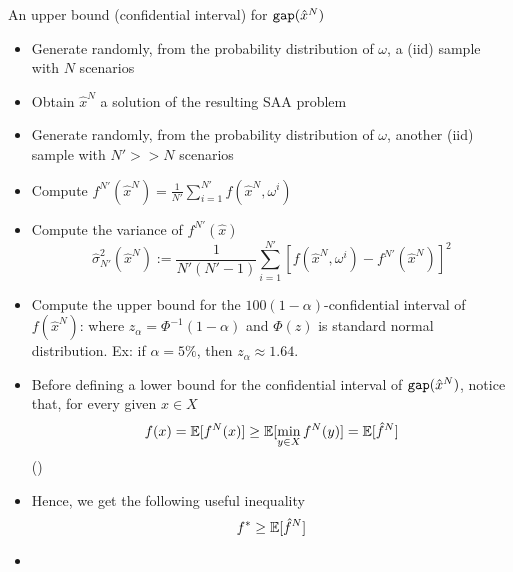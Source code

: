  
\begin{frame}{An upper bound (confidential interval) for ${\tt gap}(\hat x^N)$}
\begin{itemize}
\item Generate randomly, from the probability distribution of $\omega$, a (iid) sample with $N$ scenarios 
\pula
\item Obtain  $\hat x^N$ a solution of the resulting SAA problem
\pula
\item Generate randomly, from the probability distribution of $\omega$, another (iid) sample with $N'>>N$ scenarios 
\pula
\item Compute $f^{N'}(\hat x^N)= \frac{1}{N'}\sum_{i=1}^{N'} f(\hat x^N,\omega^i)$
\pula
\item Compute the variance of $f^{N'}(\hat x)$
\[
\hat \sigma_{N'}^2(\hat x^N):=\frac{1}{N'(N'-1)}\sum_{i=1}^{N'} [f(\hat x^N,\omega^i)-f^{N'}(\hat x^N)]^2
\]
\item Compute the upper bound for the  $100(1-\alpha)$-confidential interval of $f(\hat x^N)$:
\azul{
\[
U_{N}'(\hat x^N):= f^{N'}(\hat x^N) + z_{\alpha}\hat \sigma_{N'}(\hat x^N)\,,
\]
}
where $z_\alpha=\Phi^{-1}(1-\alpha)$ and $\Phi(z)$ is standard normal distribution. Ex: if $\alpha =5\%$, then $z_\alpha\approx 1.64$.
\end{itemize}
\end{frame} 

\begin{frame}{ }
\begin{itemize}
\item Before defining a lower bound for the confidential interval of  ${\tt gap} (\hat x^N)$, notice that, for every given $x \in X$
\[
f(x)=\mathbb{E}[f^N(x)]\geq \mathbb{E}[\min_{y \in X} f^N(y)]=\mathbb{E}[\hat f^N]
\] 
()
\pula

\item Hence, we get the following useful inequality 
\[
f^*\geq \mathbb{E}[\hat f^N]
\]
\pula
\item {}
\end{itemize}
\end{frame}


